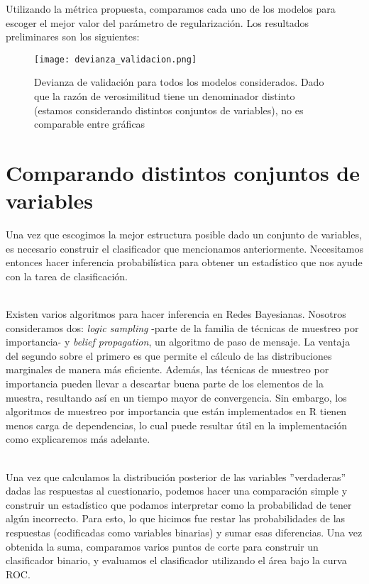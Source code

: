 Utilizando la métrica propuesta, comparamos cada uno de los modelos para escoger el mejor valor del parámetro de regularización. Los resultados preliminares son los siguientes:
\begin{figure}[h]
    \caption{Devianza de validación para todos los modelos considerados. Dado que la razón de verosimilitud tiene un denominador distinto (estamos considerando distintos conjuntos de variables), no es comparable entre gráficas}
    \texttt{[image: devianza\_validacion.png]}
\end{figure}
\section*{Comparando distintos conjuntos de variables}
Una vez que escogimos la mejor estructura posible dado un conjunto de variables, es necesario construir el clasificador que mencionamos anteriormente. Necesitamos entonces hacer inferencia probabilística para obtener un estadístico que nos ayude con la tarea de clasificación.
\par
\noindent
\\
Existen varios algoritmos para hacer inferencia en Redes Bayesianas. Nosotros consideramos dos: \textit{logic sampling} -parte de la familia de técnicas de muestreo por importancia- y \textit{belief propagation}, un algoritmo de paso de mensaje. La ventaja del segundo sobre el primero es que permite el cálculo de las distribuciones marginales de manera más eficiente. Además, las técnicas de muestreo por importancia pueden llevar a descartar buena parte de los elementos de la muestra, resultando así en un tiempo mayor de convergencia. Sin embargo, los algoritmos de muestreo por importancia que están implementados en R tienen menos carga de dependencias, lo cual puede resultar útil en la implementación como explicaremos más adelante.
\par
\noindent
\\
Una vez que calculamos la distribución posterior de las variables ''verdaderas'' dadas las respuestas al cuestionario, podemos hacer una comparación simple y construir un estadístico que podamos interpretar como la probabilidad de tener algún incorrecto. Para esto, lo que hicimos fue restar las probabilidades de las respuestas (codificadas como variables binarias) y sumar esas diferencias. Una vez obtenida la suma, comparamos varios puntos de corte para construir un clasificador binario, y evaluamos el clasificador utilizando el área bajo la curva ROC.
\par
